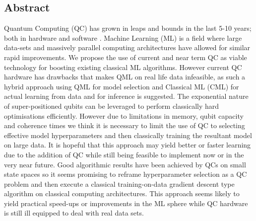 \documentclass[a0,portrait]{a0poster}
\begin{document}
\begin{multicols}{2} %
\color{Navy} %
\section*{Abstract}
Quantum Computing (QC) has grown in leaps and bounds in the last 5-10 years; both in hardware and software .  Machine Learning (ML) is a field where large data-sets and massively parallel computing architectures have allowed for similar rapid improvements. We propose the use of current and near term QC as viable technology for boosting existing classical ML algorithms. However current QC hardware has drawbacks that makes QML on real life data infeasible, as such a hybrid approach using QML for model selection and Classical ML (CML) for actual learning from data and for inference is suggested. The exponential nature of super-positioned qubits can be leveraged to perform classically hard optimisations efficiently\cite{prezsalinas2019data}. However due to limitations in memory, qubit capacity and coherence times we think it is necessary to limit the use of QC to selecting effective model hyperparameters and then classically training the resultant model on large data. It is hopeful that this approach may yield better or faster learning due to the addition of QC while still being feasible to implement now or in the very near future. Good algorithmic results have been achieved by QCs on small state spaces so it seems promising to reframe hyperparameter selection as a QC problem and then execute a classical training-on-data gradient descent type algorithm on classical computing architectures. This approach seems likely to yield practical speed-ups or improvements in the ML sphere while QC hardware is still ill equipped to deal with real data sets\cite{mcclean2018barren}.
\color{DarkSlateGray}

\end{multicols}
\end{document}
